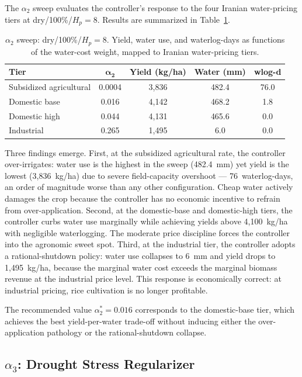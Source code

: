 The $\alpha_2$ sweep evaluates the controller's response to the four Iranian
water-pricing tiers at dry/100\%/$H_p = 8$. Results are summarized in
Table~\ref{tab:sweep-a2}.

\begin{table}[h]
\centering
\caption{$\alpha_2$ sweep: dry/100\%/$H_p=8$. Yield, water use, and
waterlog-days as functions of the water-cost weight, mapped to Iranian
water-pricing tiers.}
\label{tab:sweep-a2}
\begin{tabular}{lcccc}
\toprule
\textbf{Tier} & $\boldsymbol{\alpha_2}$
  & \textbf{Yield (kg/ha)} & \textbf{Water (mm)} & \textbf{wlog-d} \\
\midrule
Subsidized agricultural & 0.0004 & 3{,}836 & 482.4 & 76.0 \\
Domestic base           & 0.016  & 4{,}142 & 468.2 &  1.8 \\
Domestic high           & 0.044  & 4{,}131 & 465.6 &  0.0 \\
Industrial              & 0.265  & 1{,}495 &   6.0 &  0.0 \\
\bottomrule
\end{tabular}
\end{table}

Three findings emerge. First, at the subsidized agricultural rate, the
controller over-irrigates: water use is the highest in the sweep (482.4~mm)
yet yield is the lowest (3{,}836~kg/ha) due to severe field-capacity
overshoot — 76~waterlog-days, an order of magnitude worse than any other
configuration. Cheap water actively damages the crop because the controller
has no economic incentive to refrain from over-application. Second, at the
domestic-base and domestic-high tiers, the controller curbs water use
marginally while achieving yields above 4{,}100~kg/ha with negligible
waterlogging. The moderate price discipline forces the controller into the
agronomic sweet spot. Third, at the industrial tier, the controller adopts a
rational-shutdown policy: water use collapses to 6~mm and yield drops to
1{,}495~kg/ha, because the marginal water cost exceeds the marginal biomass
revenue at the industrial price level. This response is economically correct:
at industrial pricing, rice cultivation is no longer profitable.

The recommended value $\alpha_2^* = 0.016$ corresponds to the domestic-base
tier, which achieves the best yield-per-water trade-off without inducing
either the over-application pathology or the rational-shutdown collapse.

\subsection{\texorpdfstring{$\alpha_3$: Drought Stress Regularizer}{Alpha3: Drought Stress}}
\label{ssec:ctrl-sweep-a3}

